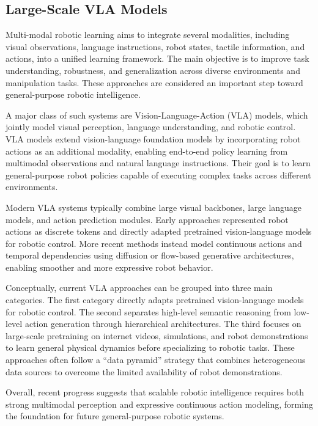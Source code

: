 \subsection{Large-Scale VLA Models}

Multi-modal robotic learning aims to integrate several modalities, including visual observations, language instructions, robot states, tactile information, and actions, into a unified learning framework. The main objective is to improve task understanding, robustness, and generalization across diverse environments and manipulation tasks. These approaches are considered an important step toward general-purpose robotic intelligence.

A major class of such systems are Vision-Language-Action (VLA) models, which jointly model visual perception, language understanding, and robotic control. VLA models extend vision-language foundation models by incorporating robot actions as an additional modality, enabling end-to-end policy learning from multimodal observations and natural language instructions. Their goal is to learn general-purpose robot policies capable of executing complex tasks across different environments.

Modern VLA systems typically combine large visual backbones, large language models, and action prediction modules. Early approaches represented robot actions as discrete tokens and directly adapted pretrained vision-language models for robotic control. More recent methods instead model continuous actions and temporal dependencies using diffusion or flow-based generative architectures, enabling smoother and more expressive robot behavior.

Conceptually, current VLA approaches can be grouped into three main categories. The first category directly adapts pretrained vision-language models for robotic control. The second separates high-level semantic reasoning from low-level action generation through hierarchical architectures. The third focuses on large-scale pretraining on internet videos, simulations, and robot demonstrations to learn general physical dynamics before specializing to robotic tasks. These approaches often follow a ``data pyramid'' strategy that combines heterogeneous data sources to overcome the limited availability of robot demonstrations.

Overall, recent progress suggests that scalable robotic intelligence requires both strong multimodal perception and expressive continuous action modeling, forming the foundation for future general-purpose robotic systems.